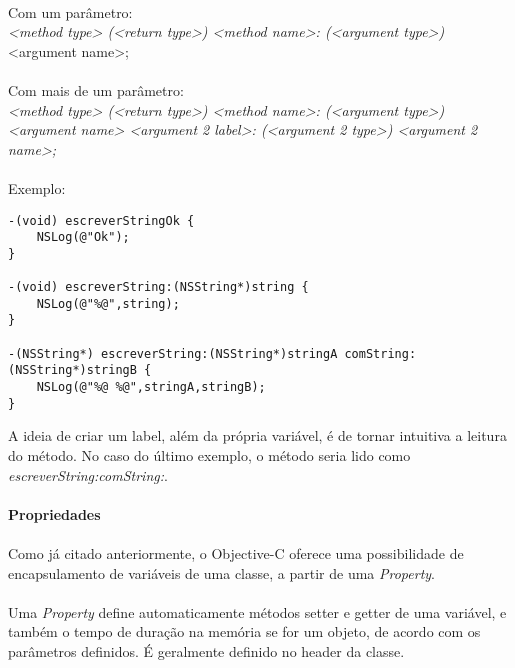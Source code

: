 \documentclass[a4paper,12pt,brazil,doubleside]{book}
\begin{document}
\paragraph{}Com um parâmetro:\\
\emph{<method type> (<return type>) <method name>: (<argument type>)} <argument name>;\\

\paragraph{}Com mais de um parâmetro:\\
\emph{<method type> (<return type>) <method name>: (<argument type>) <argument name> <argument 2 label>: (<argument 2 type>) <argument 2 name>;}\\

\paragraph{}Exemplo:

\begin{lstlisting}
-(void) escreverStringOk {
	NSLog(@"Ok");
}

-(void) escreverString:(NSString*)string {
	NSLog(@"%@",string);
}

-(NSString*) escreverString:(NSString*)stringA comString:(NSString*)stringB {
	NSLog(@"%@ %@",stringA,stringB);
}
\end{lstlisting}

\bigskip

A ideia de criar um label, além da própria variável, é de tornar intuitiva a leitura do método. No caso do último exemplo, o método seria lido como \emph{escreverString:comString:}.

\bigskip

\paragraph{}\textbf{Propriedades}

\paragraph{}Como já citado anteriormente, o Objective-C oferece uma possibilidade de encapsulamento de variáveis de uma classe, a partir de uma \textit{Property}.
\paragraph{}Uma \textit{Property} define automaticamente métodos setter e getter de uma variável, e também o tempo de duração na memória se for um objeto, de acordo com os parâmetros definidos. É geralmente definido no header da classe.
\end{document}
